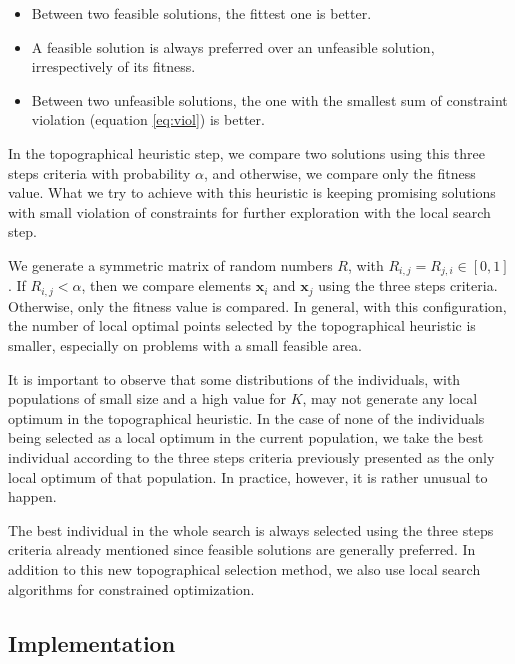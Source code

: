 \begin{itemize}

\item Between two feasible solutions, the fittest one is better.

\item A feasible solution is always preferred over an unfeasible solution, irrespectively of its fitness.

\item Between two unfeasible solutions, the one with the smallest sum of constraint violation (equation \ref{eq:viol}) is better.

\end{itemize}


In the topographical heuristic step, we compare two solutions using this three steps criteria with probability $\alpha$, and otherwise, we compare only the fitness value. What we try to achieve with this heuristic is keeping promising solutions with small violation of constraints for further exploration with the local search step.

We generate a symmetric matrix of random numbers $R$, with $R_{i, j} = R_{j, i} \in [0, 1]$. If $R_{i, j} < \alpha$, then we compare elements $\bm{x}_i$ and $\bm{x}_j$ using the three steps criteria. Otherwise, only the fitness value is compared. In general, with this configuration, the number of local optimal points selected by the topographical heuristic is smaller, especially on problems with a small feasible area. 

It is important to observe that some distributions of the individuals, with populations of small size and a high value for $K$, may not generate any local optimum in the topographical heuristic. In the case of none of the individuals being selected as a local optimum in the current population, we take the best individual according to the three steps criteria previously presented as the only local optimum of that population. In practice, however, it is rather unusual to happen.

The best individual in the whole search is always selected using the three steps criteria already mentioned since feasible solutions are generally preferred. In addition to this new topographical selection method, we also use local search algorithms for constrained optimization.


\subsection{Implementation} \label{sec:Implementation}

